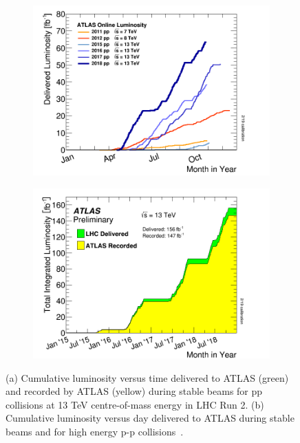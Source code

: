 \begin{figure}[]
    \centering
    \begin{subfigure}[b]{0.49\textwidth}
        \centering
        \includegraphics[width=\textwidth]{images/intlumivsyear.png}
        \caption{}
        \label{fig:method:Lumi:lumirun2year}
    \end{subfigure}
    \begin{subfigure}[b]{0.49\textwidth}
        \centering
        \includegraphics[width=\textwidth]{images/intlumivstimeRun2.png}
        \caption{}
        \label{fig:method:Lumi:lumiRun2vsatlas}
    \end{subfigure}
    \caption[Total Integrated Luminosity at Run 2 (13 TeV pp data only);
    Delivered Luminosity versus time for 2011-2018 (p-p data only)]{(a) Cumulative luminosity versus time delivered to ATLAS (green) and recorded by ATLAS (yellow) during stable beams for pp collisions at 13 TeV centre-of-mass energy in LHC Run 2. (b) Cumulative luminosity versus day delivered to ATLAS during stable beams and for high energy p-p collisions~\cite{ATLAS:lumiPlots}.}
    \label{}
\end{figure}

\clearpage